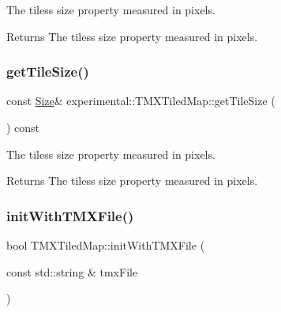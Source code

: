 The tiles\textquotesingle{}s size property measured in pixels.

\begin{DoxyReturn}{Returns}
The tiles\textquotesingle{}s size property measured in pixels. 
\end{DoxyReturn}
\mbox{\label{classexperimental_1_1TMXTiledMap_a4b40738cbf1cc2e30bef4e3dd1a8d3aa}} 
\subsubsection{\texorpdfstring{get\+Tile\+Size()}{getTileSize()}\hspace{0.1cm}{\footnotesize\ttfamily [2/2]}}
{\footnotesize\ttfamily const \hyperlink{classSize}{Size}\& experimental\+::\+T\+M\+X\+Tiled\+Map\+::get\+Tile\+Size (\begin{DoxyParamCaption}{ }\end{DoxyParamCaption}) const\hspace{0.3cm}{\ttfamily [inline]}}

The tiles\textquotesingle{}s size property measured in pixels.

\begin{DoxyReturn}{Returns}
The tiles\textquotesingle{}s size property measured in pixels. 
\end{DoxyReturn}
\mbox{\label{classexperimental_1_1TMXTiledMap_a4e75b0b3333616d3898b6119644e4137}} 
\subsubsection{\texorpdfstring{init\+With\+T\+M\+X\+File()}{initWithTMXFile()}\hspace{0.1cm}{\footnotesize\ttfamily [1/2]}}
{\footnotesize\ttfamily bool T\+M\+X\+Tiled\+Map\+::init\+With\+T\+M\+X\+File (\begin{DoxyParamCaption}\item[{const std\+::string \&}]{tmx\+File }\end{DoxyParamCaption})\hspace{0.3cm}{\ttfamily [protected]}}

